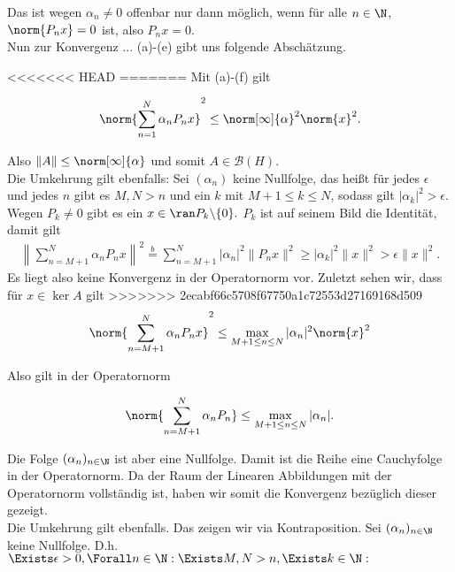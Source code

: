 \begin{solution}
Das ist wegen $\alpha_n \neq 0$ offenbar nur dann möglich, wenn für alle $n \in \N$, $\norm{P_n x} = 0$ ist, also $P_n x = 0$. \\

Nun zur Konvergenz ... (a)-(e) gibt uns folgende Abschätzung.

<<<<<<< HEAD
=======
Mit (a)-(f) gilt

\begin{align*}
    \norm{\sum_{n = 1}^N \alpha_n P_n x}^2
    \leq
    \norm[\infty]{\alpha}^2 \norm{x}^2.
\end{align*}

Also $\|A\| \leq \norm[\infty]{\alpha}$ und somit $A \in \mathcal{B}(H)$. \\

Die Umkehrung gilt ebenfalls: Sei $(\alpha_n)$ keine Nullfolge, das heißt für jedes $\epsilon$ und jedes $n$ gibt es $M, N > n$ und ein $k$ mit $M+1 \leq k \leq N$, sodass gilt $|\alpha_k|^2 > \epsilon.$ Wegen $P_k \neq 0$ gibt es ein $x \in \ran P_k\backslash\{0\}.$ $P_k$ ist auf seinem Bild die Identität, damit gilt
\begin{align}
 \left\| \sum_{n = M+1}^N \alpha_n P_n x \right\|^2 \stackrel{b}{=} \sum_{n = M+1}^N | \alpha_n|^2 \| P_n x \|^2 \geq |\alpha_k|^2 \|x\|^2 > \epsilon \|x\|^2.
\end{align}
Es liegt also keine Konvergenz in der Operatornorm vor.
Zuletzt sehen wir, dass für $x \in \ker A$ gilt
>>>>>>> 2ecabf66c5708f67750a1c72553d27169168d509
\begin{align*}
  \norm{\sum_{n = M+1}^N \alpha_n P_n x}^2
  \leq
  \max_{M+1 \leq n \leq N} |\alpha_n|^2 \norm{x}^2
\end{align*}

Also gilt in der Operatornorm

\begin{align*}
  \norm{\sum_{n = M+1}^N \alpha_n P_n}
  \leq
  \max_{M+1 \leq n \leq N} |\alpha_n|.
\end{align*}

Die Folge $(\alpha_n)_{n \in \N}$ ist aber eine Nullfolge.
Damit ist die Reihe eine Cauchyfolge in der Operatornorm.
Da der Raum der Linearen Abbildungen mit der Operatornorm vollständig ist, haben wir somit die Konvergenz bezüglich dieser gezeigt. \\

Die Umkehrung gilt ebenfalls.
Das zeigen wir via Kontraposition.
Sei $(\alpha_n)_{n \in \N}$ keine Nullfolge.
D.h. $\Exists \epsilon > 0, \Forall n \in \N: \Exists M, N > n, \Exists k \in \N:$


\end{solution}
